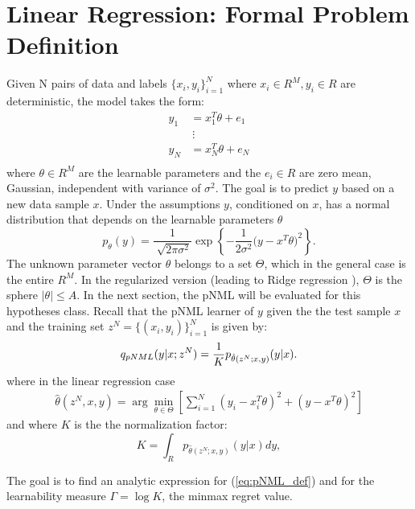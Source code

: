 \documentclass[conference,letterpaper]{IEEEtran}
\begin{document}
\section{Linear Regression: Formal Problem Definition} \label{sec:formal_problem_def}
Given N pairs of data and labels $\{x_i, y_i\}_{i=1}^{N}$ where $x_i \in R^M, y_i \in R$ are deterministic, the model takes the form:
\begin{equation}
\begin{split}
y_1&=x_1^T \theta + e_1 \\
   &\ \vdots \\
y_{N}&=x_{N}^T \theta + e_{N} \\
\end{split}
\end{equation}
where $\theta \in R^M$ are the learnable parameters and the $e_i \in R$ are zero mean, Gaussian, independent with variance of $\sigma^2$. 
The goal is to predict $y$ based on a new data sample $x$. 
Under the assumptions $y$, conditioned on $x$, has a normal distribution that depends on the learnable parameters $\theta$ 
\begin{equation}
p_{\theta}(y) 
=\frac{1}{\sqrt[]{2\pi\sigma^2}}\exp\left\{-\frac{1}{2\sigma^2}\big(y- x^T\theta \big)^2\right\}.
\end{equation}
The unknown parameter vector $\theta$ belongs to a set $\Theta$, which in the general case is the entire $R^M$. In the regularized version (leading to Ridge regression \cite{ridgeregression}), $\Theta$ is the sphere $|\theta|\leq A$. 
In the next section, the pNML will be evaluated for this hypotheses class. 
Recall that the pNML learner of $y$ given the the test sample $x$ and the training set $z^N=\{(x_i,y_i)\}_{i=1}^{N}$ is given by:
\begin{equation} \label{eq:pNML_def}
q_{\mbox{\tiny{pNML}}}(y|x;z^N) = \frac{1}{K} p_{\hat{\theta}(z^N;x,y)}(y|x).
\end{equation}
where in the linear regression case 
\begin{align}
\hat{\theta}(z^N,x,y)= \arg\min_{\theta\in\Theta} \left[ \sum_{i=1}^N \left(y_i - x_i^T\theta \right)^2 + \left(y-x^T\theta\right)^2 \right]
\end{align}
and where  $K$ is the the normalization factor:
\begin{equation} \label{gamma}
K = \int_R  p_{\hat{\theta}(z^N;x,y)}(y|x)dy,   
\end{equation}

The goal is to find an analytic expression for (\ref{eq:pNML_def}) and for the learnability measure $\Gamma = \log K$, the minmax regret value.
\end{document}
